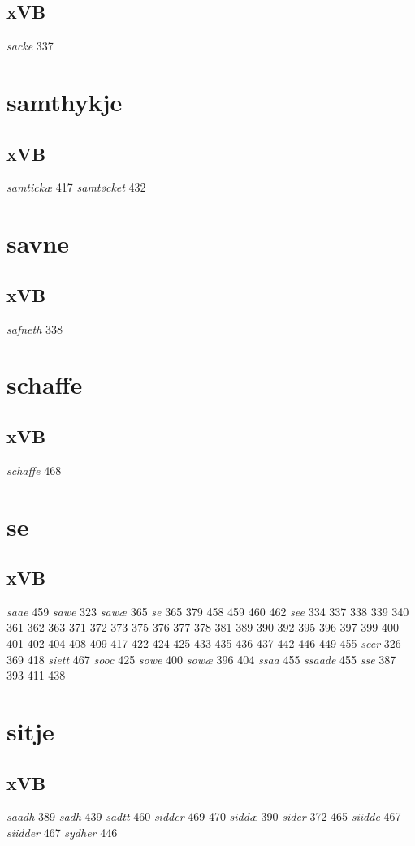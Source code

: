 \documentclass[a4paper,twocolumn]{article}
\begin{document}
\subsection{xVB}
\label{sec:org55bd8c1}
\emph{sacke} 337 
\section{samthykje}
\label{sec:org16cd5a8}
\subsection{xVB}
\label{sec:orgba1c783}
\emph{samtickæ} 417 \emph{samtøcket} 432 
\section{savne}
\label{sec:org7210039}
\subsection{xVB}
\label{sec:orgf0366e7}
\emph{safneth} 338 
\section{schaffe}
\label{sec:orgac9dc9b}
\subsection{xVB}
\label{sec:orgec74a78}
\emph{schaffe} 468 
\section{se}
\label{sec:orga38444d}
\subsection{xVB}
\label{sec:org4a241e3}
\emph{saae} 459 \emph{sawe} 323 \emph{sawæ} 365 \emph{se} 365 379 458 459 460 462 \emph{see} 334 337 338 339 340 361 362 363 371 372 373 375 376 377 378 381 389 390 392 395 396 397 399 400 401 402 404 408 409 417 422 424 425 433 435 436 437 442 446 449 455 \emph{seer} 326 369 418 \emph{siett} 467 \emph{sooc} 425 \emph{sowe} 400 \emph{sowæ} 396 404 \emph{ssaa} 455 \emph{ssaade} 455 \emph{sse} 387 393 411 438 
\section{sitje}
\label{sec:orga0ca1ad}
\subsection{xVB}
\label{sec:orge14eca8}
\emph{saadh} 389 \emph{sadh} 439 \emph{sadtt} 460 \emph{sidder} 469 470 \emph{siddæ} 390 \emph{sider} 372 465 \emph{siidde} 467 \emph{siidder} 467 \emph{sydher} 446 
\end{document}
